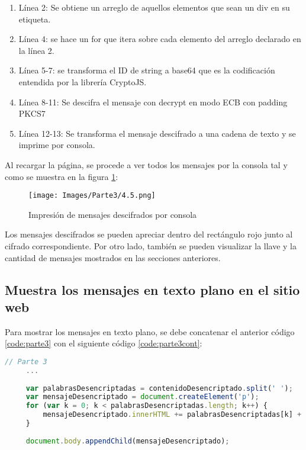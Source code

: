 \documentclass[letter,12pt]{article}
\newcounter{codecount}
\begin{document}
\begin{enumerate}
    \item Línea 2: Se obtiene un arreglo de aquellos elementos que sean un div en su etiqueta.

    \item Línea 4: se hace un for que itera sobre cada elemento del arreglo declarado en la línea 2.

    \item Línea 5-7: se transforma el ID de string a base64 que es la codificación entendida por la librería CryptoJS.

    \item Línea 8-11: Se descifra el mensaje con decrypt en modo ECB con padding PKCS7

    \item Línea 12-13: Se transforma el mensaje descifrado a una cadena de texto y se imprime por consola.
\end{enumerate}

\clearpage

Al recargar la página, se procede a ver todos los mensajes por la consola tal y como se muestra en la figura \ref{fig:Impresiondemensajes}:

\begin{figure}[H]
    \centering
    \texttt{[image: Images/Parte3/4.5.png]}
    \caption{Impresión de mensajes descifrados por consola}
    \label{fig:Impresiondemensajes}
\end{figure}

Los mensajes descifrados se pueden apreciar dentro del rectángulo rojo junto al cifrado correspondiente. Por otro lado, también se pueden visualizar la llave y la cantidad de mensajes mostrados en las secciones anteriores.

\clearpage

\subsection{Muestra los mensajes en texto plano en el sitio web}

Para mostrar los mensajes en texto plano, se debe concatenar el anterior código \ref{code:parte3} con el siguiente código \ref{code:parte3cont}:

\label{code:parte3cont}
\begin{lstlisting}[language=JavaScript, caption={mostrar mensajes en texto plano}]
// Parte 3
     ...
  
     var palabrasDesencriptadas = contenidoDesencriptado.split(' ');
     var mensajeDesencriptado = document.createElement('p');
     for (var k = 0; k < palabrasDesencriptadas.length; k++) {
         mensajeDesencriptado.innerHTML += palabrasDesencriptadas[k] + '<br>';
     }
  
     document.body.appendChild(mensajeDesencriptado);

\end{lstlisting}
\end{document}
